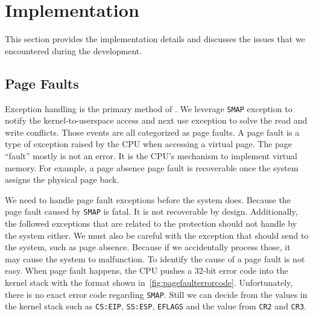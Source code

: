 

\section{Implementation}
\label{sec:implementation}

This section provides the implementation details and discusses the issues that we encountered during the development.



\subsection{Page Faults}


Exception handling is the primary method of \name. We leverage \texttt{SMAP} exception to notify the kernel-to-userspace access and next use exception to solve the read and write conflicts. Those events are all categorized as page faults. A page fault is a type of exception raised by the CPU when accessing a virtual page. The page ``fault'' mostly is not an error. It is the CPU's mechanism to implement virtual memory. For example, a page absence page fault is recoverable once the system assigns the physical page back.

We need to handle page fault exceptions before the system does.
Because the page fault caused by \texttt{SMAP} is fatal. It is not recoverable by design. Additionally, the followed exceptions that are related to the protection should not handle by the system either. We must also be careful with the exception that should send to the system, such as page absence. Because if we accidentally process those, it may cause the system to malfunction. To identify the cause of a page fault is not easy.  When page fault happens, the CPU pushes a 32-bit error code into the kernel stack with the format shown in~\autoref{fig:pagefaulterrorcode}.  Unfortunately, there is no exact error code regarding \texttt{SMAP}.  Still we can decide from the values in the kernel stack such as \texttt{CS:EIP}, \texttt{SS:ESP}, \texttt{EFLAGS} and the value from \texttt{CR2} and \texttt{CR3}.

